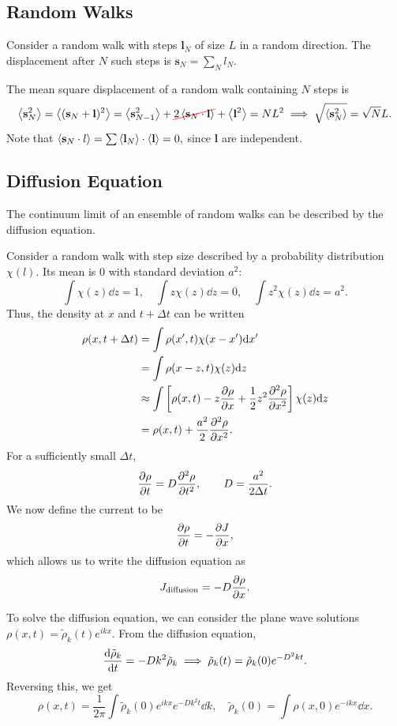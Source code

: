 \documentclass{article}
\begin{document}
\subsection{Random Walks}
Consider a random walk with steps $\mathbf l_N$ of size $L$ in a random direction. The displacement after $N$ such steps is $\mathbf s_N=\sum_Nl_N$.

The mean square displacement of a random walk containing $N$ steps is 
$$\ev{\mathbf s_N^2}=\ev{(\mathbf s_N+\mathbf l)^2}=\ev{\mathbf s_{N-1}^2}+\Ccancel[red]{2\ev{\mathbf s_N\cdot\mathbf l}}+\ev{\mathbf l^2}=NL^2\implies\sqrt{\ev{\mathbf s_N^2}}=\sqrt NL.$$
Note that $\ev{\mathbf s_N\cdot l}=\sum\ev{\mathbf l_N}\cdot\ev{\mathbf l}=0,$ since $\mathbf l$ are independent.

\subsection{Diffusion Equation}
The continuum limit of an ensemble of random walks can be described by the diffusion equation. 

Consider a random walk with step size described by a probability distribution $\chi(l)$. Its mean is $0$ with standard deviation $a^2$:
$$\int \chi(z)\dd z=1,\quad \int z\chi(z)\dd z=0,\quad\int z^2\chi(z)\dd z=a^2.$$
Thus, the density at $x$ and $t+\Delta t$ can be written 
\begin{align*}
    \rho(x,t+\Delta t)&=\int\rho(x',t)\chi(x-x')\dd x'\\
    &=\int\rho(x-z,t)\chi(z)\dd z\\
    &\approx\int\left[\rho(x,t)-z \frac{\partial \rho}{\partial x}+\frac 12z^2\frac{\partial^{2}\rho}{\partial{x}^{2}}\right]\chi(z)\dd z\\
    &=\rho(x,t)+\frac{a^2}{2}\frac{\partial^{2}\rho}{\partial{x}^{2}}.
\end{align*}
For a sufficiently small $\Delta t$,
\begin{equation}
     \frac{\partial \rho}{\partial t}=D\frac{\partial^{2}\rho}{\partial{t}^{2}},\qquad D=\frac{a^2}{2\Delta t}.
\end{equation}
We now define the current to be 
\begin{equation}
     \frac{\partial \rho}{\partial t}=- \frac{\partial J}{\partial x},
\end{equation}
which allows us to write the diffusion equation as 
\begin{equation}
    J_\text{diffusion}=-D \frac{\partial \rho}{\partial x}.
\end{equation}

To solve the diffusion equation, we can consider the plane wave solutions $\rho(x,t)=\tilde\rho_k(t)e^{ikx}$. From the diffusion equation,
$$\frac{\mathrm{d}\tilde\rho_k}{\mathrm{d}t}=-Dk^2\tilde\rho_k\implies\tilde\rho_k(t)=\tilde\rho_k(0)e^{-D^2kt}.$$
Reversing this, we get
$$\rho(x,t)=\frac 1{2\pi}\int\tilde\rho_k(0)e^{ikx}e^{-Dk^2t}\dd k,\quad \tilde\rho_k(0)=\int\rho(x,0)e^{-ikx}\dd x.$$
\end{document}
